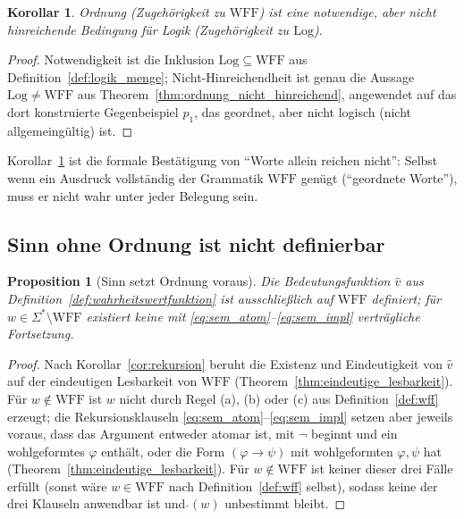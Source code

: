 \documentclass[12pt, a4paper]{article}
\newtheorem{proposition}[theorem]{Proposition}
\newtheorem{corollary}[theorem]{Korollar}
\theoremstyle{definition}
\theoremstyle{remark}
\newcommand{\WFF}{\mathrm{WFF}}
\newcommand{\Log}{\mathrm{Log}}
\begin{document}
\begin{corollary}
\label{cor:ordnung_reicht_nicht}
Ordnung (Zugehörigkeit zu $\WFF$) ist eine notwendige, aber nicht hinreichende Bedingung für Logik (Zugehörigkeit zu $\Log$).
\end{corollary}
\begin{proof}
Notwendigkeit ist die Inklusion $\Log \subseteq \WFF$ aus Definition~\ref{def:logik_menge}; Nicht-Hinreichendheit ist genau die Aussage $\Log \ne \WFF$ aus Theorem~\ref{thm:ordnung_nicht_hinreichend}, angewendet auf das dort konstruierte Gegenbeispiel $p_1$, das geordnet, aber nicht logisch (nicht allgemeingültig) ist.
\end{proof}

Korollar~\ref{cor:ordnung_reicht_nicht} ist die formale Bestätigung von ``Worte allein reichen nicht'': Selbst wenn ein Ausdruck vollständig der Grammatik $\WFF$ genügt (``geordnete Worte''), muss er nicht wahr unter jeder Belegung sein.

\subsection{Sinn ohne Ordnung ist nicht definierbar}
\label{subsec:sinn_ohne_ordnung}

\begin{proposition}[Sinn setzt Ordnung voraus]
\label{prop:sinn_setzt_ordnung_voraus}
Die Bedeutungsfunktion $\hat v$ aus Definition~\ref{def:wahrheitswertfunktion} ist ausschließlich auf $\WFF$ definiert; für $w \in \Sigma^\ast \setminus \WFF$ existiert keine mit \eqref{eq:sem_atom}--\eqref{eq:sem_impl} verträgliche Fortsetzung.
\end{proposition}
\begin{proof}
Nach Korollar~\ref{cor:rekursion} beruht die Existenz und Eindeutigkeit von $\hat v$ auf der eindeutigen Lesbarkeit von $\WFF$ (Theorem~\ref{thm:eindeutige_lesbarkeit}). Für $w \notin \WFF$ ist $w$ nicht durch Regel (a), (b) oder (c) aus Definition~\ref{def:wff} erzeugt; die Rekursionsklauseln \eqref{eq:sem_atom}--\eqref{eq:sem_impl} setzen aber jeweils voraus, dass das Argument entweder atomar ist, mit $\neg$ beginnt und ein wohlgeformtes $\varphi$ enthält, oder die Form $(\varphi\to\psi)$ mit wohlgeformten $\varphi,\psi$ hat (Theorem~\ref{thm:eindeutige_lesbarkeit}). Für $w \notin \WFF$ ist keiner dieser drei Fälle erfüllt (sonst wäre $w \in \WFF$ nach Definition~\ref{def:wff} selbst), sodass keine der drei Klauseln anwendbar ist und $\hat{}(w)$ unbestimmt bleibt.
\end{proof}
\end{document}
